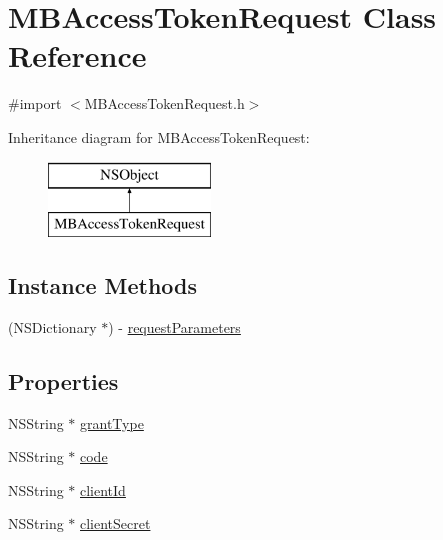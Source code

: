 \hypertarget{interface_m_b_access_token_request}{\section{M\-B\-Access\-Token\-Request Class Reference}
\label{interface_m_b_access_token_request}
}


{\ttfamily \#import $<$M\-B\-Access\-Token\-Request.\-h$>$}

Inheritance diagram for M\-B\-Access\-Token\-Request\-:\begin{figure}[H]
\begin{center}
\leavevmode
\includegraphics[height=2.000000cm]{interface_m_b_access_token_request}
\end{center}
\end{figure}
\subsection*{Instance Methods}
\begin{DoxyCompactItemize}
\item 
(N\-S\-Dictionary $\ast$) -\/ \hyperlink{interface_m_b_access_token_request_a4d3c7a419dcb0f78e0ba7d834f70386f}{request\-Parameters}
\end{DoxyCompactItemize}
\subsection*{Properties}
\begin{DoxyCompactItemize}
\item 
N\-S\-String $\ast$ \hyperlink{interface_m_b_access_token_request_a52e672ad01be6b1a9964eaaf6c6a2588}{grant\-Type}
\item 
N\-S\-String $\ast$ \hyperlink{interface_m_b_access_token_request_a549c06ee69a73342a20ede0aeb923a9f}{code}
\item 
N\-S\-String $\ast$ \hyperlink{interface_m_b_access_token_request_a5767d093288ee9c96f122b2bbdc4c5a7}{client\-Id}
\item 
N\-S\-String $\ast$ \hyperlink{interface_m_b_access_token_request_a7742581a757f1414020d206f1bcd7c43}{client\-Secret}
\end{DoxyCompactItemize}


